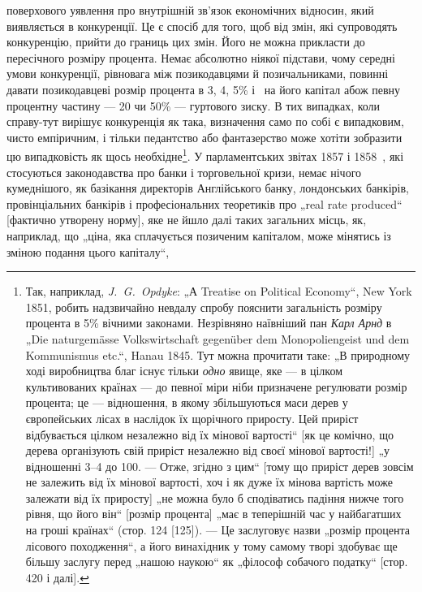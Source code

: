 \parcont{}  %
поверхового уявлення про внутрішній зв’язок економічних відносин,
який виявляється в конкуренції. Це є спосіб для того, щоб від
змін, які супроводять конкуренцію, прийти до границь цих змін.
Його не можна прикласти до пересічного розміру процента.
Немає абсолютно ніякої підстави, чому середні умови конкуренції,
рівновага між позикодавцями й позичальниками, повинні давати
позикодавцеві розмір процента в 3, 4, 5\% і~ на його капітал
абож певну процентну частину — 20 чи 50\% — гуртового
зиску. В тих випадках, коли справу-тут вирішує конкуренція як
така, визначення само по собі є випадковим, чисто емпіричним,
і тільки педантство або фантазерство може хотіти зобразити
цю випадковість як щось необхідне\footnote{
Так, наприклад, \emph{J.~G.~Opdyke}: „А Treatise on Political Economy“, New
York 1851, робить надзвичайно невдалу спробу пояснити загальність розміру
процента в 5\% вічними законами. Незрівняно наївніший пан \emph{Карл Арнд} в „Die
naturgemässe Volkswirtschaft gegenüber dem Monopoliengeist und dem Kommunismus
etc.“, Hanau 1845. Тут можна прочитати таке: „В природному ході виробництва
благ існує тільки \emph{одно} явище, яке — в цілком культивованих країнах — до
певної міри ніби призначене регулювати розмір процента; це — відношення,
в якому збільшуються маси дерев у європейських лісах в наслідок їх щорічного
приросту. Цей приріст відбувається цілком незалежно від їх мінової вартості“
[як це комічно, що дерева організують свій приріст незалежно від своєї мінової
вартості!] „у відношенні 3--4 до 100. — Отже, згідно з цим“ [тому що приріст
дерев зовсім не залежить від їх мінової вартості, хоч і як дуже їх мінова вартість
може залежати від їх приросту] „не можна було б сподіватись падіння
нижче того рівня, що його він“ [розмір процента] „має в теперішній час у
найбагатших на гроші країнах“ (стор. 124 [125]). — Це заслуговує назви „розмір
процента лісового походження“, а його винахідник у тому самому творі здобуває
ще більшу заслугу перед „нашою наукою“ як „філософ собачого податку“
[стор. 420 і далі].
}. У парламентських звітах
1857 і 1858~, які стосуються законодавства про банки і торговельної
кризи, немає нічого кумеднішого, як базікання директорів
Англійського банку, лондонських банкірів, провінціальних
банкірів і професіональних теоретиків про „real rate produced“
[фактично утворену норму], яке не йшло далі таких загальних
місць, як, наприклад, що „ціна, яка сплачується позиченим
капіталом, може мінятись із зміною подання цього капіталу“,

